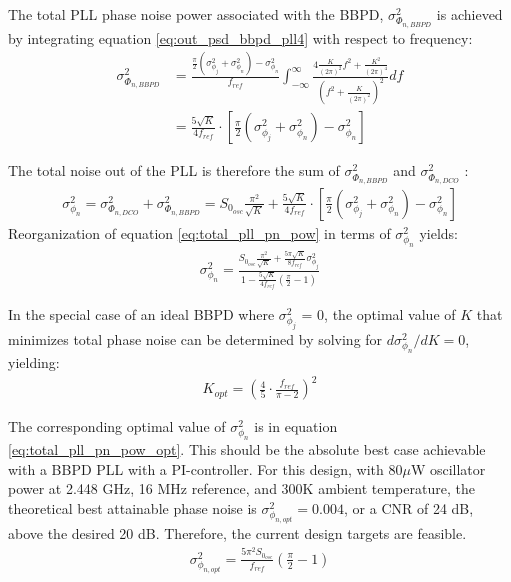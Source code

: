 			The total PLL phase noise power associated with the BBPD, $\sigma_{\Phi_{n,BBPD}}^2$ is achieved by integrating equation \ref{eq:out_psd_bbpd_pll4} with respect to frequency:
			\begin{align}\label{eq:out_psd_bbpd_pll5} 
				\sigma_{\Phi_{n,BBPD}}^2 & =
				\frac{\frac{\pi}{2}(\sigma^2_{\phi_j} +
				\sigma^2_{\phi_n})-\sigma^2_{\phi_n}}{f_{ref}}\int_{-\infty}^{\infty}\frac{4\frac{K}{(2\pi)^2}f^2
				+ \frac{K^2}{(2\pi)^4}}{\left(f^2+\frac{K}{(2\pi)^2}\right)^2}df\\ &= 
				\frac{5\sqrt{K}}{4f_{ref}}\cdot\left[\frac{\pi}{2}(\sigma^2_{\phi_j} +
			\sigma^2_{\phi_n})-\sigma^2_{\phi_n}\right] \end{align} 

			The total noise out of the PLL is therefore the sum of $\sigma_{\Phi_{n,BBPD}}^2$ and $\sigma_{\Phi_{n,DCO}}^2$ : 
			\begin{align} \label{eq:total_pll_pn_pow}
				\sigma^2_{\phi_n}  = \sigma_{\Phi_{n,DCO}}^2 + \sigma_{\Phi_{n,BBPD}}^2 =
				S_{0_{osc}}\frac{\pi^2}{\sqrt{K}} +
				\frac{5\sqrt{K}}{4f_{ref}}\cdot\left[\frac{\pi}{2}(\sigma^2_{\phi_j} +
				\sigma^2_{\phi_n})-\sigma^2_{\phi_n}\right] 
			\end{align} 
			Reorganization of equation \ref{eq:total_pll_pn_pow} in terms of $\sigma^2_{\phi_n}$ yields:
			\begin{align} \label{eq:total_pll_pn_pow2} \sigma^2_{\phi_n}  =
				\frac{S_{0_{osc}}\frac{\pi^2}{\sqrt{K}} +
				\frac{5\pi\sqrt{K}}{8f_{ref}}\sigma^2_{\phi_j}}{1-\frac{5\sqrt{K}}{4f_{ref}}(\frac{\pi}{2}-1)}
			\end{align}			 

			In the special case of an ideal BBPD where $\sigma^2_{\phi_j}$ = 0, the optimal value of $K$ that minimizes total phase noise can be determined by solving for $d\sigma^2_{\phi_n}/dK = 0$, yielding:
			\begin{align} \label{eq:k_opt} K_{opt} =
				\left(\frac{4}{5}\cdot\frac{f_{ref}}{\pi-2}\right)^2 
			\end{align}	 

			The corresponding optimal value of $\sigma^2_{\phi_n} $ is in equation \ref{eq:total_pll_pn_pow_opt}. This should be the absolute best case achievable with a BBPD PLL with a PI-controller. For this design, with 80$\mu$W oscillator power at 2.448 GHz, 16 MHz reference, and 300K ambient temperature, the theoretical best attainable phase noise is $\sigma^2_{\phi_{n,opt}}=0.004$, or a CNR of 24 dB, above the desired 20 dB. Therefore, the current design targets are feasible. 
			\begin{align} \label{eq:total_pll_pn_pow_opt} 
				\sigma^2_{\phi_{n,opt}}  =
				\frac{5\pi^2S_{0_{osc}}}{f_{ref}}\left(\frac{\pi}{2}-1\right) 
			\end{align}	 

